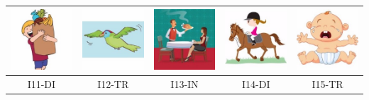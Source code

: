 \documentclass[12pt,notitlepage]{article}
\begin{document}
\begin{center}
\begin{tabular}{|c||c||c||c||c|}
\includegraphics[width=0.16\columnwidth]{square/I06.jpg} &  \includegraphics[width=0.16\columnwidth]{square/I07.jpg} &  \includegraphics[width=0.16\columnwidth]{square/I08.jpg} & \includegraphics[width=0.16\columnwidth]{square/I09.jpg} & \includegraphics[width=0.16\columnwidth]{square/I10.jpg} \\
\hline
\hline
I11-DI & I12-TR & I13-IN & I14-DI & I15-TR \\

\end{tabular}
\end{center}
\end{document}
